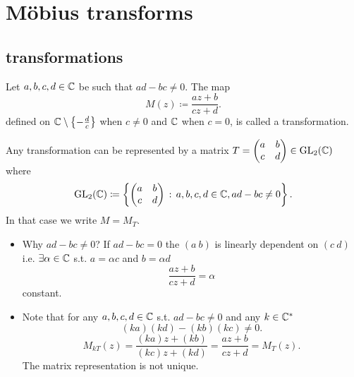 \documentclass[10pt, a4paper]{article}
\begin{document}
\newpage

\section{M\"{o}bius transforms}

\subsection{\mobius transformations}

\begin{definition}
    Let $a, b, c, d \in \mathbb{C}$ be such that $ad - bc \neq 0$.
    The map
    \[
    M(z) \coloneqq \frac{az + b}{cz + d}.
    \]
    defined on $\mathbb{C} \setminus \left\{-\frac{d}{c}\right\}$ when $c \neq 0$ and $\mathbb{C}$ when $c = 0$,
    is called a \mobius transformation.
\end{definition}

Any \mobius transformation can be represented by a matrix $T = \begin{pmatrix}
    a & b \\ c & d
\end{pmatrix} \in \mathrm{GL}_2(\mathbb{C})$ where
\[
\mathrm{GL}_2(\mathbb{C}) \coloneqq \left\{\begin{pmatrix}
    a & b \\ c & d
\end{pmatrix}\,:\, a, b, c, d \in \mathbb{C}, ad - bc \neq 0\right\}.
\]
In that case we write $M = M_T$.

\begin{remark}\phantom{}
    \begin{itemize}
        \item Why $ad - bc \neq 0$?
        If $ad - bc = 0$ the $(a\ b)$ is linearly dependent on $(c\ d)$ i.e. $\exists \alpha \in \mathbb{C}$ s.t. $a = \alpha c$ and $b = \alpha d$
        \[
        \frac{az + b}{cz + d} = \alpha
        \]
        constant.

        \item Note that for any $a, b, c, d \in \mathbb{C}$ s.t. $ad - bc \neq 0$ and any $k \in \mathbb{C} ^ {*}$
        \[
        (ka)(kd) - (kb)(kc) \neq 0.
        \]
        \[
        M_{kT}(z) = \frac{(ka)z + (kb)}{(kc)z + (kd)} = \frac{az + b}{cz + d} = M_T(z).
        \]
        The matrix representation is not unique.
    \end{itemize}
\end{remark}
\end{document}
